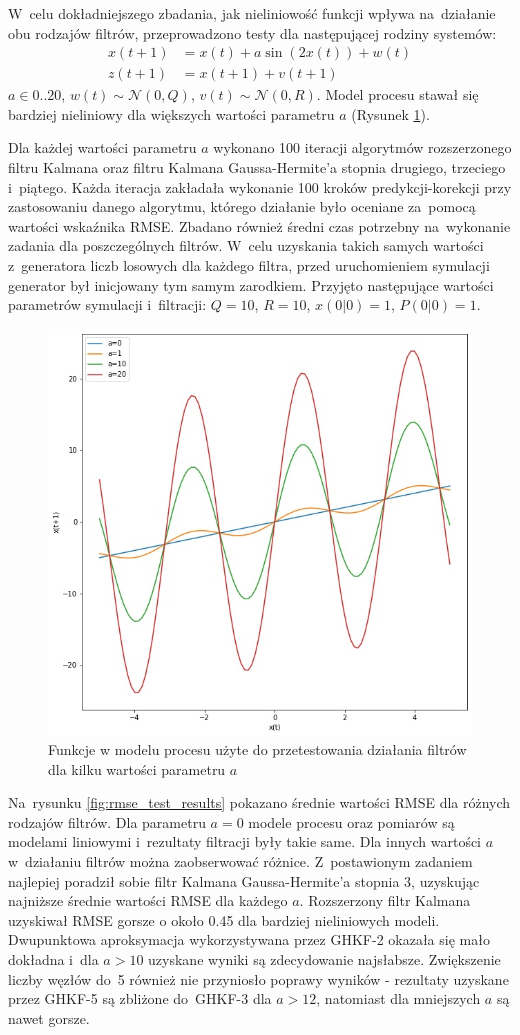 \par


W~celu dokładniejszego zbadania, jak nieliniowość funkcji wpływa na~działanie obu rodzajów filtrów, przeprowadzono testy dla następującej rodziny systemów:
\begin{align}\label{eq:rmseTestModel}
x(t+1) &= x(t) + a\sin(2x(t)) + w(t) \nonumber \\
z(t+1) &= x(t+1) + v(t+1)
\end{align}
$a\in{0..20}$, $w(t) \sim \mathcal{N}(0, Q)$, $v(t) \sim \mathcal{N}(0, R)$. Model procesu stawał się bardziej nieliniowy dla większych wartości parametru $a$ (Rysunek \ref{fig:rmse_test_functions}). \par
Dla każdej wartości parametru $a$ wykonano 100 iteracji algorytmów rozszerzonego filtru Kalmana oraz filtru Kalmana Gaussa-Hermite'a stopnia drugiego, trzeciego i~piątego. Każda iteracja zakładała wykonanie 100 kroków predykcji-korekcji przy zastosowaniu danego algorytmu, którego działanie było oceniane za~pomocą wartości wskaźnika RMSE. Zbadano również średni czas potrzebny na~wykonanie zadania dla poszczególnych filtrów. W~celu uzyskania takich samych wartości z~generatora liczb losowych dla każdego filtra, przed uruchomieniem symulacji generator był inicjowany tym samym zarodkiem. Przyjęto następujące wartości parametrów symulacji i~filtracji: $Q=10$, $R=10$, $x(0|0)=1$, $P(0|0)=1$. \par
\begin{figure}[h!]
	\centering
	\includegraphics[width=0.5\linewidth]{rmse_test_functions.jpg}
	\caption{Funkcje w modelu procesu użyte do przetestowania działania filtrów dla kilku wartości parametru $a$}
	\label{fig:rmse_test_functions}
\end{figure}
Na~rysunku \ref{fig:rmse_test_results} pokazano średnie wartości RMSE dla różnych rodzajów filtrów. Dla parametru $a=0$ modele procesu oraz pomiarów są modelami liniowymi i~rezultaty filtracji były takie same. Dla innych wartości $a$ w~działaniu filtrów można zaobserwować różnice. Z~postawionym zadaniem najlepiej poradził sobie filtr Kalmana Gaussa-Hermite'a stopnia 3, uzyskując najniższe średnie wartości RMSE dla każdego $a$. Rozszerzony filtr Kalmana uzyskiwał RMSE gorsze o około 0.45 dla bardziej nieliniowych modeli. Dwupunktowa aproksymacja wykorzystywana przez GHKF-2 okazała się mało dokładna i~dla $a>10$ uzyskane wyniki są zdecydowanie najsłabsze. Zwiększenie liczby węzłów do~5 również nie przyniosło poprawy wyników - rezultaty uzyskane przez GHKF-5 są zbliżone do~GHKF-3 dla $a>12$, natomiast dla mniejszych $a$ są nawet gorsze. \par
